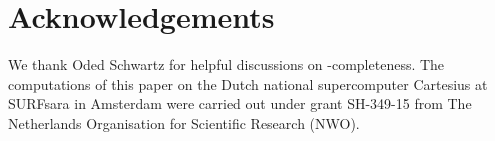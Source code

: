 \section{Acknowledgements}
We thank Oded Schwartz for helpful discussions on \NP-completeness.
The computations of this paper on the Dutch national supercomputer Cartesius
at SURFsara in Amsterdam  were carried out under grant
SH-349-15 from The Netherlands Organisation for Scientific Research (NWO).

